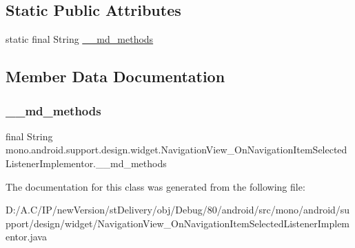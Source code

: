 \subsection*{Static Public Attributes}
\begin{DoxyCompactItemize}
\item 
static final String \hyperlink{classmono_1_1android_1_1support_1_1design_1_1widget_1_1_navigation_view___on_navigation_item_selected_listener_implementor_a30bf6324733fb7eb1ec7e952888ba859}{\+\_\+\+\_\+md\+\_\+methods}
\end{DoxyCompactItemize}


\subsection{Member Data Documentation}
\mbox{\label{classmono_1_1android_1_1support_1_1design_1_1widget_1_1_navigation_view___on_navigation_item_selected_listener_implementor_a30bf6324733fb7eb1ec7e952888ba859}} 
\subsubsection{\texorpdfstring{\+\_\+\+\_\+md\+\_\+methods}{\_\_md\_methods}}
{\footnotesize\ttfamily final String mono.\+android.\+support.\+design.\+widget.\+Navigation\+View\+\_\+\+On\+Navigation\+Item\+Selected\+Listener\+Implementor.\+\_\+\+\_\+md\+\_\+methods\hspace{0.3cm}{\ttfamily [static]}}



The documentation for this class was generated from the following file\+:\begin{DoxyCompactItemize}
\item 
D\+:/\+A.\+C/\+I\+P/new\+Version/st\+Delivery/obj/\+Debug/80/android/src/mono/android/support/design/widget/Navigation\+View\+\_\+\+On\+Navigation\+Item\+Selected\+Listener\+Implementor.\+java\end{DoxyCompactItemize}
